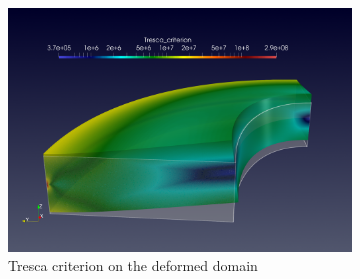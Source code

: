 \begin{figure}[!ht]
  \hfill
  \begin{subfigure}[c]{0.49\textwidth}
    \centering
    \includegraphics[width=\textwidth]{graphics/feelpp/feelpp-benchmark-nafems-le10-solution-tresca-wrap.png}
    \caption{Tresca criterion on the deformed domain}
    \label{fig:feelpp:wp1:nafems-le10:results:visualization:wrap-tresca}
  \end{subfigure}
  \hfill
  \begin{subfigure}[c]{0.49\textwidth}

    \centering
    \captionsetup[subfigure]{justification=centering}

    \dataTableMeasures
    \def\myLineWidth{2pt}
    \def\myLineStyleA{loosely dashdotdotted} %
    \def\myLineStyleB{dashed}
    \def\myLineStyleC{solid}

    \def\myAddPlot#1#2#3#4{
      \addplot[#3,every mark/.append style={solid},
      x filter/.code={
        \pgfmathparse{\thisrow{PolyOrder}==#2}
        \ifnum0=\pgfmathresult
        \pgfmathsetmacro{\newx}{nan}
      \else
        \pgfmathsetmacro{\newx}{\thisrow{Mesh}}
      \fi
      \pgfmathparse{\newx}
    },
    y filter/.expression={ #4*\pgfmathresult }
    ] table [x=Mesh, y=#1] {\dataTableMeasures};
  }


\end{subfigure}
\end{figure}
